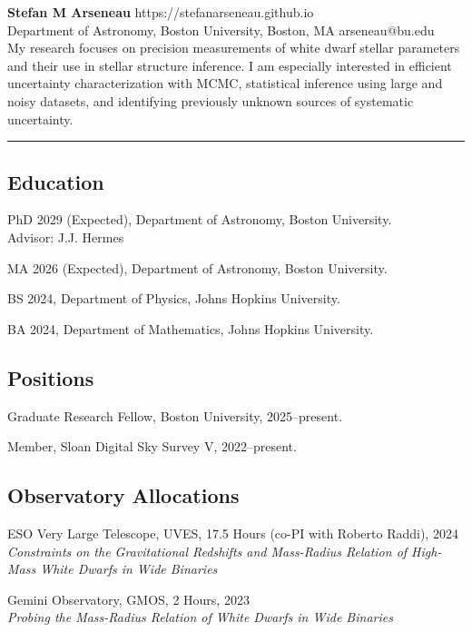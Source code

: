 \documentclass[12pt,letterpaper]{article}
\begin{document}
\thispagestyle{empty}\sloppy\sloppypar\raggedbottom

\textbf{\Large Stefan M Arseneau} \hfill
\textsf{\small https://stefanarseneau.github.io} \\[0.5ex]
Department of Astronomy, Boston University, Boston, MA  \hfill \textsf{\small arseneau@bu.edu} \\[0.5ex]

\vspace{0.5em}
\justifying \noindent My research focuses on precision measurements of white dwarf stellar parameters and their use in stellar structure inference. I am especially interested in efficient uncertainty characterization with MCMC, statistical inference using large and noisy datasets, and identifying previously unknown sources of systematic uncertainty.

\vspace{0.5em}
\noindent\rule{\textwidth}{0.4pt}

\subsection{Education}
\begin{list}{}{\cvlist}
  \item
        PhD 2029 (Expected), Department of Astronomy, Boston University. \\Advisor: J.J. Hermes
  \item
        MA 2026 (Expected), Department of Astronomy, Boston University.
  \item
        BS 2024, Department of Physics, Johns Hopkins University.
   \item
        BA 2024, Department of Mathematics, Johns Hopkins University.
\end{list}

\subsection{Positions}
\begin{list}{}{\cvlist}
  \item
        Graduate Research Fellow, Boston University, 2025--present.
  \item
        Member, Sloan Digital Sky Survey V, 2022--present.
\end{list}

\subsection{Observatory Allocations}
\begin{list}{}{\cvlist}
  \item
        ESO Very Large Telescope, UVES, 17.5 Hours (co-PI with Roberto Raddi), 2024 \\
        {\it Constraints on the Gravitational Redshifts and Mass-Radius Relation of High-Mass White Dwarfs in Wide Binaries}
  \item
       Gemini Observatory, GMOS, 2 Hours, 2023 \\
        {\it Probing the Mass-Radius Relation of White Dwarfs in Wide Binaries}
\end{list}
\end{document}
